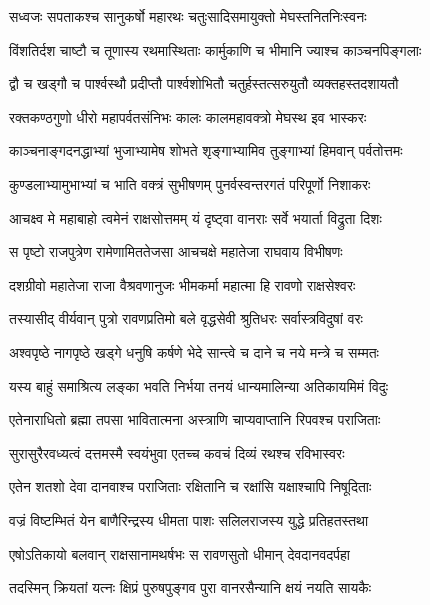 \twolineshloka
{सध्वजः सपताकश्च सानुकर्षो महारथः}
{चतुःसादिसमायुक्तो मेघस्तनितनिःस्वनः} %

\twolineshloka
{विंशतिर्दश चाष्टौ च तूणास्य रथमास्थिताः}
{कार्मुकाणि च भीमानि ज्याश्च काञ्चनपिङ्गलाः} %

\twolineshloka
{द्वौ च खड्गौ च पार्श्वस्थौ प्रदीप्तौ पार्श्वशोभितौ}
{चतुर्हस्तत्सरुयुतौ व्यक्तहस्तदशायतौ} %

\twolineshloka
{रक्तकण्ठगुणो धीरो महापर्वतसंनिभः}
{कालः कालमहावक्त्रो मेघस्थ इव भास्करः} %

\twolineshloka
{काञ्चनाङ्गदनद्धाभ्यां भुजाभ्यामेष शोभते}
{शृङ्गाभ्यामिव तुङ्गाभ्यां हिमवान् पर्वतोत्तमः} %

\twolineshloka
{कुण्डलाभ्यामुभाभ्यां च भाति वक्त्रं सुभीषणम्}
{पुनर्वस्वन्तरगतं परिपूर्णो निशाकरः} %

\twolineshloka
{आचक्ष्व मे महाबाहो त्वमेनं राक्षसोत्तमम्}
{यं दृष्ट्वा वानराः सर्वे भयार्ता विद्रुता दिशः} %

\twolineshloka
{स पृष्टो राजपुत्रेण रामेणामिततेजसा}
{आचचक्षे महातेजा राघवाय विभीषणः} %

\twolineshloka
{दशग्रीवो महातेजा राजा वैश्रवणानुजः}
{भीमकर्मा महात्मा हि रावणो राक्षसेश्वरः} %

\twolineshloka
{तस्यासीद् वीर्यवान् पुत्रो रावणप्रतिमो बले}
{वृद्धसेवी श्रुतिधरः सर्वास्त्रविदुषां वरः} %

\twolineshloka
{अश्वपृष्ठे नागपृष्ठे खड्गे धनुषि कर्षणे}
{भेदे सान्त्वे च दाने च नये मन्त्रे च सम्मतः} %

\twolineshloka
{यस्य बाहुं समाश्रित्य लङ्का भवति निर्भया}
{तनयं धान्यमालिन्या अतिकायमिमं विदुः} %

\twolineshloka
{एतेनाराधितो ब्रह्मा तपसा भावितात्मना}
{अस्त्राणि चाप्यवाप्तानि रिपवश्च पराजिताः} %

\twolineshloka
{सुरासुरैरवध्यत्वं दत्तमस्मै स्वयंभुवा}
{एतच्च कवचं दिव्यं रथश्च रविभास्वरः} %

\twolineshloka
{एतेन शतशो देवा दानवाश्च पराजिताः}
{रक्षितानि च रक्षांसि यक्षाश्चापि निषूदिताः} %

\twolineshloka
{वज्रं विष्टम्भितं येन बाणैरिन्द्रस्य धीमता}
{पाशः सलिलराजस्य युद्धे प्रतिहतस्तथा} %

\twolineshloka
{एषोऽतिकायो बलवान् राक्षसानामथर्षभः}
{स रावणसुतो धीमान् देवदानवदर्पहा} %

\twolineshloka
{तदस्मिन् क्रियतां यत्नः क्षिप्रं पुरुषपुङ्गव}
{पुरा वानरसैन्यानि क्षयं नयति सायकैः} %

